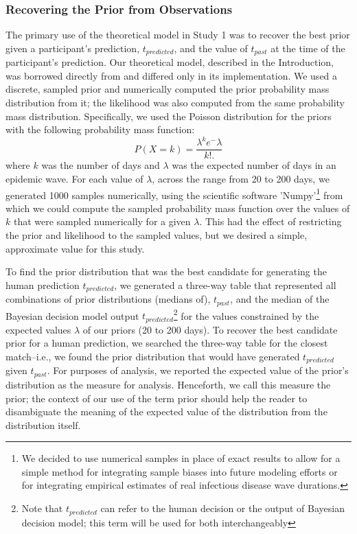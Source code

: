 \subsubsection{Recovering the Prior from Observations}
The primary use of the theoretical model in Study 1 was to recover the best prior given a participant's prediction, $t_{predicted}$, and the value of $t_{past}$ at the time of the participant's prediction.  Our theoretical model, described in the Introduction, was borrowed directly from \citep{GriffithsTenenbaum2006} and differed only in its implementation. We used a discrete, sampled prior and numerically computed the prior probability mass distribution from it; the likelihood was also computed from the same probability mass distribution.  Specifically, we used the Poisson distribution for the priors with the following probability mass function: 
\begin{equation}\label{eq:poisson}
   P(X=k) =  \frac {\lambda^k e^-{\lambda}}{k!.}
\end{equation}
where $k$ was the number of days and $\lambda$ was the expected number of days in an epidemic wave.  For each value of $\lambda$, across the range from 20 to 200 days, we generated 1000 samples numerically, using the scientific software 'Numpy'\footnote{We decided to use numerical samples in place of exact results to allow for a simple method for integrating sample biases into future modeling efforts or for integrating empirical estimates of real infectious disease wave durations.} from which we could compute the sampled probability mass function over the values of $k$ that were sampled numerically for a given $\lambda$.  This had the effect of restricting the prior and likelihood to the sampled values, but we desired a simple, approximate value for this study.

To find the prior distribution that was the best candidate for generating the human prediction $t_{predicted}$, we generated a three-way table that represented all combinations of prior distributions (medians of), $t_{past}$, and the median of the Bayesian decision model output $t_{predicted}$\footnote{Note that $t_{predicted}$ can refer to the human decision or the output of Bayesian decision model; this term will be used for both interchangeably} for the values constrained by the expected values $\lambda$ of our priors (20 to 200 days).  To recover the best candidate prior for a human prediction, we searched the three-way table for the closest match--i.e., we found the prior distribution that would have generated $t_{predicted}$ given $t_{past}$.  For purposes of analysis, we reported the expected value of the prior's distribution as the measure for analysis. Henceforth, we call this measure the prior; the context of our use of the term prior should help the reader to disambiguate the meaning of the expected value of the distribution from the distribution itself.  


